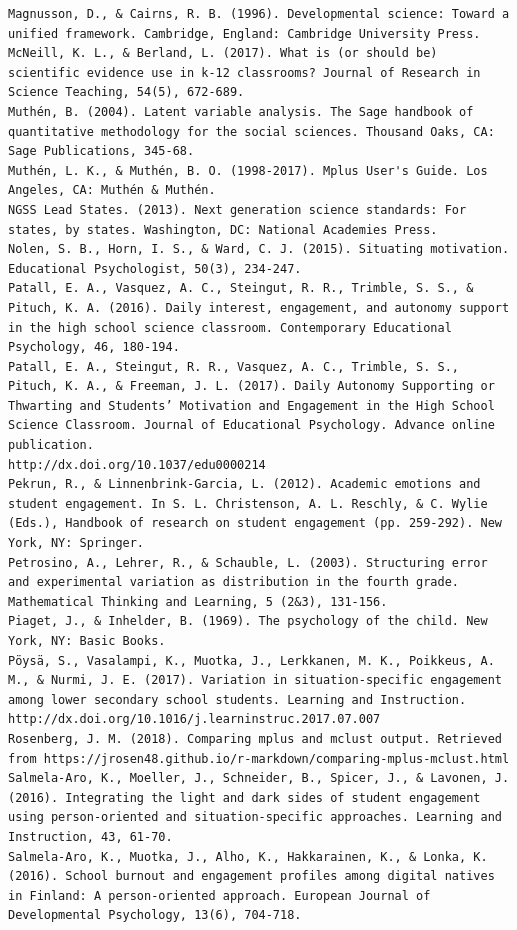 \documentclass[]{msu-thesis}
\theoremstyle{definition}
\theoremstyle{definition}
\theoremstyle{definition}
\theoremstyle{remark}
\begin{document}
\begin{verbatim}
Magnusson, D., & Cairns, R. B. (1996). Developmental science: Toward a unified framework. Cambridge, England: Cambridge University Press.  
McNeill, K. L., & Berland, L. (2017). What is (or should be) scientific evidence use in k‐12 classrooms? Journal of Research in Science Teaching, 54(5), 672-689.  
Muthén, B. (2004). Latent variable analysis. The Sage handbook of quantitative methodology for the social sciences. Thousand Oaks, CA: Sage Publications, 345-68.  
Muthén, L. K., & Muthén, B. O. (1998-2017). Mplus User's Guide. Los Angeles, CA: Muthén & Muthén.
NGSS Lead States. (2013). Next generation science standards: For states, by states. Washington, DC: National Academies Press.  
Nolen, S. B., Horn, I. S., & Ward, C. J. (2015). Situating motivation. Educational Psychologist, 50(3), 234-247.
Patall, E. A., Vasquez, A. C., Steingut, R. R., Trimble, S. S., & Pituch, K. A. (2016). Daily interest, engagement, and autonomy support in the high school science classroom. Contemporary Educational Psychology, 46, 180-194.  
Patall, E. A., Steingut, R. R., Vasquez, A. C., Trimble, S. S., Pituch, K. A., & Freeman, J. L. (2017). Daily Autonomy Supporting or Thwarting and Students’ Motivation and Engagement in the High School Science Classroom. Journal of Educational Psychology. Advance online publication.
http://dx.doi.org/10.1037/edu0000214  
Pekrun, R., & Linnenbrink-Garcia, L. (2012). Academic emotions and student engagement. In S. L. Christenson, A. L. Reschly, & C. Wylie (Eds.), Handbook of research on student engagement (pp. 259-292). New York, NY: Springer.
Petrosino, A., Lehrer, R., & Schauble, L. (2003). Structuring error and experimental variation as distribution in the fourth grade. Mathematical Thinking and Learning, 5 (2&3), 131-156.  
Piaget, J., & Inhelder, B. (1969). The psychology of the child. New York, NY: Basic Books.  
Pöysä, S., Vasalampi, K., Muotka, J., Lerkkanen, M. K., Poikkeus, A. M., & Nurmi, J. E. (2017). Variation in situation-specific engagement among lower secondary school students. Learning and Instruction. http://dx.doi.org/10.1016/j.learninstruc.2017.07.007  
Rosenberg, J. M. (2018). Comparing mplus and mclust output. Retrieved from https://jrosen48.github.io/r-markdown/comparing-mplus-mclust.html
Salmela-Aro, K., Moeller, J., Schneider, B., Spicer, J., & Lavonen, J. (2016). Integrating the light and dark sides of student engagement using person-oriented and situation-specific approaches. Learning and Instruction, 43, 61-70.  
Salmela-Aro, K., Muotka, J., Alho, K., Hakkarainen, K., & Lonka, K. (2016). School burnout and engagement profiles among digital natives in Finland: A person-oriented approach. European Journal of Developmental Psychology, 13(6), 704-718.  

\end{verbatim}
\end{document}
